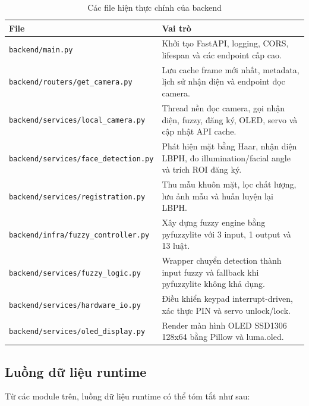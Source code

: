 \begin{table}[H]
\centering
\caption{Các file hiện thực chính của backend}
\label{tab:backend_implementation_files}
\begin{tabularx}{\textwidth}{|l|X|}
\hline
\textbf{File} & \textbf{Vai trò} \\
\hline
\texttt{backend/main.py} & Khởi tạo FastAPI, logging, CORS, lifespan và các endpoint cấp cao. \\
\hline
\texttt{backend/routers/get\_camera.py} & Lưu cache frame mới nhất, metadata, lịch sử nhận diện và endpoint đọc camera. \\
\hline
\texttt{backend/services/local\_camera.py} & Thread nền đọc camera, gọi nhận diện, fuzzy, đăng ký, OLED, servo và cập nhật API cache. \\
\hline
\texttt{backend/services/face\_detection.py} & Phát hiện mặt bằng Haar, nhận diện LBPH, đo illumination/facial angle và trích ROI đăng ký. \\
\hline
\texttt{backend/services/registration.py} & Thu mẫu khuôn mặt, lọc chất lượng, lưu ảnh mẫu và huấn luyện lại LBPH. \\
\hline
\texttt{backend/infra/fuzzy\_controller.py} & Xây dựng fuzzy engine bằng pyfuzzylite với 3 input, 1 output và 13 luật. \\
\hline
\texttt{backend/services/fuzzy\_logic.py} & Wrapper chuyển detection thành input fuzzy và fallback khi pyfuzzylite không khả dụng. \\
\hline
\texttt{backend/services/hardware\_io.py} & Điều khiển keypad interrupt-driven, xác thực PIN và servo unlock/lock. \\
\hline
\texttt{backend/services/oled\_display.py} & Render màn hình OLED SSD1306 128x64 bằng Pillow và luma.oled. \\
\hline
\end{tabularx}
\end{table}

\subsection{Luồng dữ liệu runtime}

Từ các module trên, luồng dữ liệu runtime có thể tóm tắt như sau:


